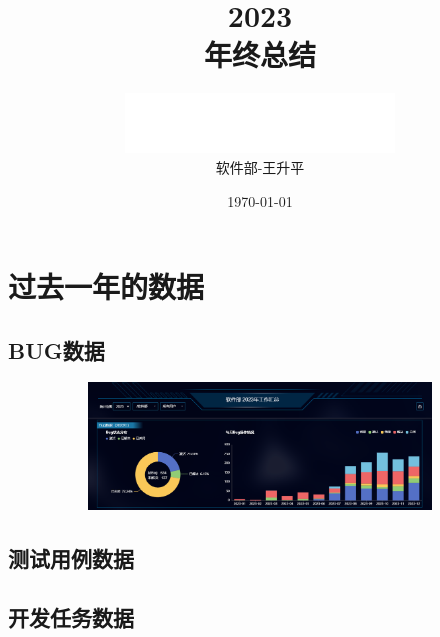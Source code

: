 \documentclass[AutoFakeBold,AutoFakeSlant]{beamer}
\title{\textbf{2023}\\年终总结}
\date{\today}
\author{\includegraphics[width=0.26\linewidth]{logo}\\软件部-王升平}
\begin{document}
	\maketitle
	
	\section{过去一年的数据}
	\subsection{BUG数据}
	\begin{frame}[fragile]
		\begin{figure}
			\centering %
			\begin{subfigure}{\linewidth}
				\includegraphics[width=\linewidth]{bug}
			\end{subfigure}
		\end{figure} 
	\end{frame}
	
	\subsection{测试用例数据}
	\begin{frame}[fragile]
	\end{frame}
	
	\subsection{开发任务数据}
	\begin{frame}[fragile]
	\end{frame}
	
	
\end{document}
